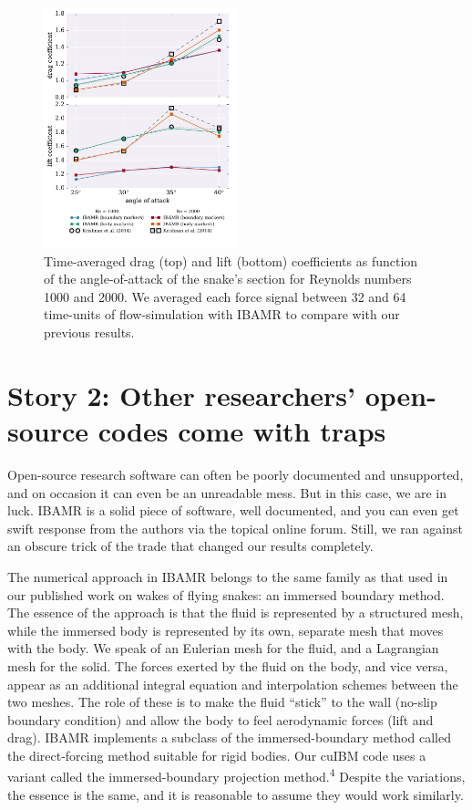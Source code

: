 \documentclass[9pt,twocolumn,twoside]{article}
\newlength{\up}
\begin{document}
\begin{figure}[h]
\centering
\includegraphics[width=0.5\textwidth]{./figures/ibamr_forceCoefficientsVsAoA.pdf}
\caption{
Time-averaged drag (top) and lift (bottom) coefficients as function of the angle-of-attack of the snake's section for Reynolds numbers 1000 and 2000.
We averaged each force signal between 32 and 64 time-units of flow-simulation with IBAMR to compare with our previous results.}
\label{figure6}
\end{figure}



\section*{Story 2: Other researchers' open-source codes come with traps}

Open-source research software can often be poorly documented and unsupported, and on occasion it can even be an unreadable mess. 
But in this case, we are in luck.
IBAMR is a solid piece of software, well documented, and you can even get swift response from the authors via the topical online forum.
Still, we ran against an obscure trick of the trade that changed our results completely. 

The numerical approach in IBAMR belongs to the same family as that used in our published work on wakes of flying snakes: an immersed boundary method. 
The essence of the approach is that the fluid is represented by a structured mesh, while the immersed body is represented by its own, separate mesh that moves with the body. 
We speak of an Eulerian mesh for the fluid, and a Lagrangian mesh for the solid. 
The forces exerted by the fluid on the body, and vice versa, appear as an additional integral equation and interpolation schemes between the two meshes. 
The role of these is to make the fluid ``stick'' to the wall (no-slip boundary condition) and allow the body to feel aerodynamic forces (lift and drag).
IBAMR implements a subclass of the immersed-boundary method called the direct-forcing method suitable for rigid bodies.
Our cuIBM code uses a variant called the immersed-boundary projection method.\textsuperscript{4}
Despite the variations, the essence is the same, and it is reasonable to assume they would work similarly.
\end{document}
